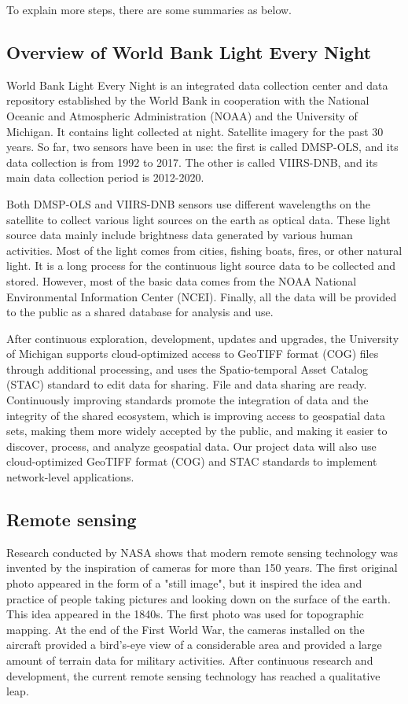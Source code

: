 \documentclass[conference]{IEEEtran}
\begin{document}
To explain more steps, there are some summaries as below. 

\subsection{Overview of World Bank Light Every Night}
World Bank Light Every Night \cite{WorldBan13:online} is an integrated data collection center and data repository established by the World Bank in cooperation with the National Oceanic and Atmospheric Administration (NOAA) and the University of Michigan. It contains light collected at night. Satellite imagery for the past 30 years. So far, two sensors have been in use: the first is called DMSP-OLS, and its data collection is from 1992 to 2017. The other is called VIIRS-DNB, and its main data collection period is 2012-2020.
    
Both DMSP-OLS and VIIRS-DNB sensors use different wavelengths on the satellite to collect various light sources on the earth as optical data. These light source data mainly include brightness data generated by various human activities. Most of the light comes from cities, fishing boats, fires, or other natural light. It is a long process for the continuous light source data to be collected and stored. However, most of the basic data comes from the NOAA National Environmental Information Center (NCEI). Finally, all the data will be provided to the public as a shared database for analysis and use.
    
After continuous exploration, development, updates and upgrades, the University of Michigan supports cloud-optimized access to GeoTIFF format (COG) files through additional processing, and uses the Spatio-temporal Asset Catalog (STAC) standard to edit data for sharing. File and data sharing are ready. Continuously improving standards promote the integration of data and the integrity of the shared ecosystem, which is improving access to geospatial data sets, making them more widely accepted by the public, and making it easier to discover, process, and analyze geospatial data. Our project data will also use cloud-optimized GeoTIFF format (COG) and STAC standards to implement network-level applications.

\subsection{Remote sensing}
Research conducted by NASA shows that modern remote sensing technology was invented by the inspiration of cameras for more than 150 years\cite{earthdata28:online}. The first original photo appeared in the form of a "still image", but it inspired the idea and practice of people taking pictures and looking down on the surface of the earth. This idea appeared in the 1840s. The first photo was used for topographic mapping. At the end of the First World War, the cameras installed on the aircraft provided a bird's-eye view of a considerable area and provided a large amount of terrain data for military activities. After continuous research and development, the current remote sensing technology has reached a qualitative leap.
\end{document}
